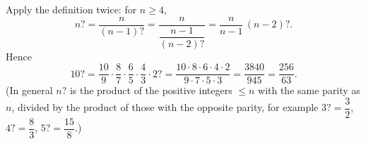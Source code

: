 Apply the definition twice: for $n\ge4$,
\[
n?=\dfrac{n}{(n-1)?}=\dfrac{n}{\dfrac{n-1}{(n-2)?}}=\dfrac{n}{n-1}\,(n-2)? .
\]
Hence
\[
10?=\dfrac{10}{9}\cdot\dfrac{8}{7}\cdot\dfrac{6}{5}\cdot\dfrac{4}{3}\cdot 2?=\dfrac{10\cdot8\cdot6\cdot4\cdot2}{9\cdot7\cdot5\cdot3}=\dfrac{3840}{945}=\boxed{\dfrac{256}{63}} .
\]
(In general $n?$ is the product of the positive integers $\le n$ with the same parity as $n$, divided by the product of those with the opposite parity, for example $3?=\dfrac{3}{2}$, $4?=\dfrac{8}{3}$, $5?=\dfrac{15}{8}$.)
